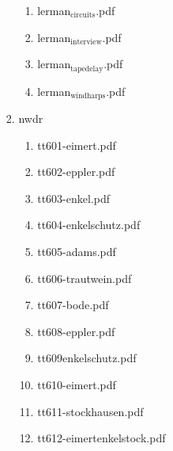 \documentclass[11pt]{article}
\begin{document}
\begin{enumerate}
\begin{enumerate}
\begin{enumerate}
\begin{enumerate}
\item lerman$_{\text{circuits}}$.pdf
\label{sec-1-1-1-1-11-19-20-19-7-20-3}

\item lerman$_{\text{interview}}$.pdf
\label{sec-1-1-1-1-11-19-20-19-7-20-4}

\item lerman$_{\text{tapedelay}}$.pdf
\label{sec-1-1-1-1-11-19-20-19-7-20-5}

\item lerman$_{\text{windharps}}$.pdf
\label{sec-1-1-1-1-11-19-20-19-7-20-6}
\end{enumerate}

\item nwdr
\label{sec-1-1-1-1-11-19-20-19-7-21}
\begin{enumerate}
\item tt601-eimert.pdf
\label{sec-1-1-1-1-11-19-20-19-7-21-1}

\item tt602-eppler.pdf
\label{sec-1-1-1-1-11-19-20-19-7-21-2}

\item tt603-enkel.pdf
\label{sec-1-1-1-1-11-19-20-19-7-21-3}

\item tt604-enkelschutz.pdf
\label{sec-1-1-1-1-11-19-20-19-7-21-4}

\item tt605-adams.pdf
\label{sec-1-1-1-1-11-19-20-19-7-21-5}

\item tt606-trautwein.pdf
\label{sec-1-1-1-1-11-19-20-19-7-21-6}

\item tt607-bode.pdf
\label{sec-1-1-1-1-11-19-20-19-7-21-7}

\item tt608-eppler.pdf
\label{sec-1-1-1-1-11-19-20-19-7-21-8}

\item tt609enkelschutz.pdf
\label{sec-1-1-1-1-11-19-20-19-7-21-9}

\item tt610-eimert.pdf
\label{sec-1-1-1-1-11-19-20-19-7-21-10}

\item tt611-stockhausen.pdf
\label{sec-1-1-1-1-11-19-20-19-7-21-11}

\item tt612-eimertenkelstock.pdf
\label{sec-1-1-1-1-11-19-20-19-7-21-12}
\end{enumerate}
\end{enumerate}
\end{enumerate}


\end{enumerate}
\end{document}
